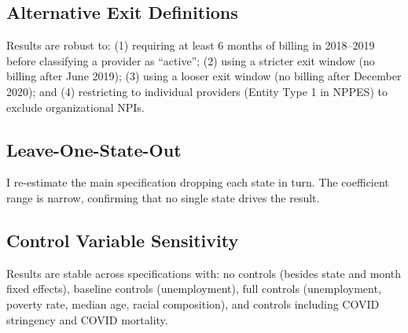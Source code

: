 \documentclass[12pt]{article}
\begin{document}
\subsection{Alternative Exit Definitions}

Results are robust to: (1) requiring at least 6 months of billing in 2018--2019 before classifying a provider as ``active''; (2) using a stricter exit window (no billing after June 2019); (3) using a looser exit window (no billing after December 2020); and (4) restricting to individual providers (Entity Type 1 in NPPES) to exclude organizational NPIs.

\subsection{Leave-One-State-Out}

I re-estimate the main specification dropping each state in turn. The coefficient range is narrow, confirming that no single state drives the result.

\subsection{Control Variable Sensitivity}

Results are stable across specifications with: no controls (besides state and month fixed effects), baseline controls (unemployment), full controls (unemployment, poverty rate, median age, racial composition), and controls including COVID stringency and COVID mortality.
\end{document}
